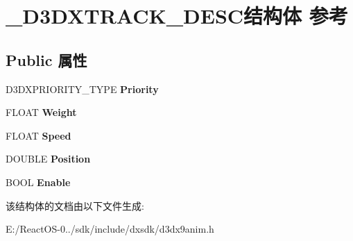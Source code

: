 \hypertarget{struct___d3_d_x_t_r_a_c_k___d_e_s_c}{}\section{\+\_\+\+D3\+D\+X\+T\+R\+A\+C\+K\+\_\+\+D\+E\+S\+C结构体 参考}
\label{struct___d3_d_x_t_r_a_c_k___d_e_s_c}
\subsection*{Public 属性}
\begin{DoxyCompactItemize}
\item 
\mbox{\label{struct___d3_d_x_t_r_a_c_k___d_e_s_c_ac7fe4e22981cad970b478cbb298f597c}} 
D3\+D\+X\+P\+R\+I\+O\+R\+I\+T\+Y\+\_\+\+T\+Y\+PE {\bfseries Priority}
\item 
\mbox{\label{struct___d3_d_x_t_r_a_c_k___d_e_s_c_ac00f089ab4742054540755d52b4adaf8}} 
F\+L\+O\+AT {\bfseries Weight}
\item 
\mbox{\label{struct___d3_d_x_t_r_a_c_k___d_e_s_c_a022e5314ab45675fd92ddf9494a0c08c}} 
F\+L\+O\+AT {\bfseries Speed}
\item 
\mbox{\label{struct___d3_d_x_t_r_a_c_k___d_e_s_c_ad9910ba6f3c8b322560f89dbe999f678}} 
D\+O\+U\+B\+LE {\bfseries Position}
\item 
\mbox{\label{struct___d3_d_x_t_r_a_c_k___d_e_s_c_a394c5a8c70a34fd20a1a2b3424cd7f6c}} 
B\+O\+OL {\bfseries Enable}
\end{DoxyCompactItemize}


该结构体的文档由以下文件生成\+:\begin{DoxyCompactItemize}
\item 
E\+:/\+React\+O\+S-\/0../sdk/include/dxsdk/d3dx9anim.\+h\end{DoxyCompactItemize}
